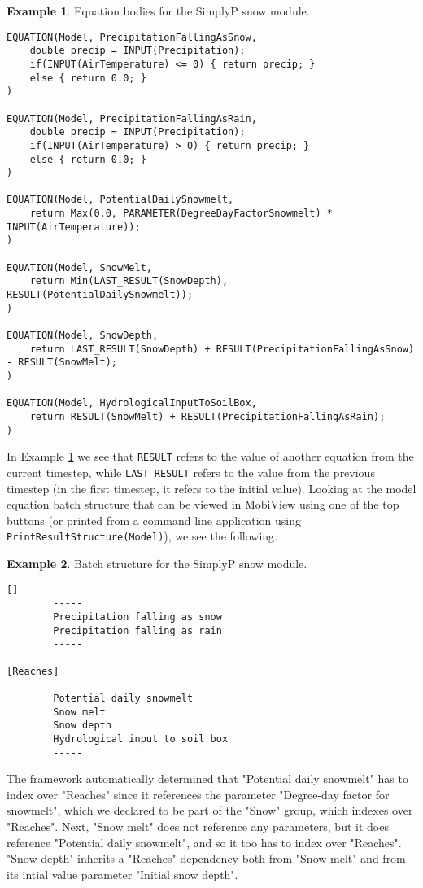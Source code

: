 \documentclass[11pt]{article}
\theoremstyle{definition}
\newtheorem{myexample}{Example}
\newenvironment{example}%
  {\begin{lrbox}{\examplebox}%
   \begin{minipage}{\dimexpr\linewidth-2\fboxsep}
   \begin{myexample}}%
  {\end{myexample}%
   \end{minipage}%
   \end{lrbox}%
   \begin{trivlist}
     \item[]\colorbox{silver}{\usebox\examplebox}
   \end{trivlist}}
\begin{document}
\begin{example}\label{ex:simplypequations}
Equation bodies for the SimplyP snow module.
\begin{lstlisting}[style=mycpp]
EQUATION(Model, PrecipitationFallingAsSnow,
	double precip = INPUT(Precipitation);
	if(INPUT(AirTemperature) <= 0) { return precip; }
	else { return 0.0; }
)

EQUATION(Model, PrecipitationFallingAsRain,
	double precip = INPUT(Precipitation);
	if(INPUT(AirTemperature) > 0) { return precip; }
	else { return 0.0; }
)

EQUATION(Model, PotentialDailySnowmelt,
	return Max(0.0, PARAMETER(DegreeDayFactorSnowmelt) * INPUT(AirTemperature));
)

EQUATION(Model, SnowMelt,
	return Min(LAST_RESULT(SnowDepth), RESULT(PotentialDailySnowmelt));
)

EQUATION(Model, SnowDepth,
	return LAST_RESULT(SnowDepth) + RESULT(PrecipitationFallingAsSnow) - RESULT(SnowMelt);
)

EQUATION(Model, HydrologicalInputToSoilBox,
	return RESULT(SnowMelt) + RESULT(PrecipitationFallingAsRain);
)
\end{lstlisting}
\end{example}

In Example \ref{ex:simplypequations} we see that {\tt RESULT} refers to the value of another equation from the current timestep, while {\tt LAST\_RESULT} refers to the value from the previous timestep (in the first timestep, it refers to the initial value). Looking at the model equation batch structure that can be viewed in MobiView using one of the top buttons (or printed from a command line application using {\tt PrintResultStructure(Model)}), we see the following.

\begin{example}
Batch structure for the SimplyP snow module.
\begin{lstlisting}[style=textstyle]
[]
        -----
        Precipitation falling as snow
        Precipitation falling as rain
        -----

[Reaches]
        -----
        Potential daily snowmelt
        Snow melt
        Snow depth
        Hydrological input to soil box
        -----
\end{lstlisting}
\end{example}

The framework automatically determined that "Potential daily snowmelt" has to index over "Reaches" since it references the parameter "Degree-day factor for snowmelt", which we declared to be part of the "Snow" group, which indexes over "Reaches". Next, "Snow melt" does not reference any parameters, but it does reference "Potential daily snowmelt", and so it too has to index over "Reaches". "Snow depth" inherits a "Reaches" dependency both from "Snow melt" and from its intial value parameter "Initial snow depth".
\end{document}
